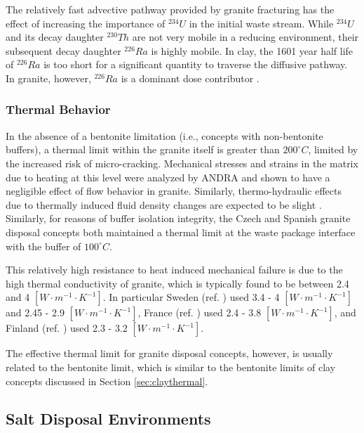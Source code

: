 The relatively fast advective pathway provided by granite fracturing
has the effect of increasing the importance of $^{234}U$ in the initial waste 
stream. While $^{234}U$ and its decay daughter $^{230}Th$ are not very mobile 
in a reducing environment, their subsequent decay daughter $^{226}Ra$ is highly 
mobile. In clay, the 1601 year half life of $^{226}Ra$ is too short for a 
significant quantity to traverse the diffusive pathway. In granite, however,  
$^{226}Ra$ is a dominant dose contributor \cite{swift_applying_2010}. 

\subsubsection{Thermal Behavior}
\label{subsec:granitethermal}
In the absence of a bentonite limitation (i.e., concepts with non-bentonite 
buffers), a thermal limit within the granite itself is greater than 
$200^{\circ}C$, limited by the increased risk of micro-cracking.
Mechanical stresses and strains in the matrix due to heating at this 
level were analyzed by \gls{ANDRA} and shown to have a negligible effect of 
flow behavior in granite. Similarly, thermo-hydraulic effects due to thermally
induced fluid density changes are expected to be slight 
\cite{andra_granite:_2005}.
Similarly, for reasons of buffer isolation integrity, the Czech and Spanish
granite disposal concepts both maintained a thermal limit at the waste package
interface with the buffer of $100^{\circ}C$.  \cite{von_lensa_red-impact_2008}

This relatively high resistance to heat  induced mechanical failure is due to the 
high thermal conductivity of granite, which is typically found to be between 
2.4 and 4 $[W\cdot m^{-1}\cdot K^{-1}]$.  In particular Sweden (ref. 
\cite{ab_long-term_2006}) used 3.4 - 4 $[W\cdot m^{-1}\cdot K^{-1}]$  and 2.45 
- 2.9 $[W\cdot m^{-1}\cdot K^{-1}]$,  France (ref.  \cite{andra_argile:_2005}) 
used 2.4 - 3.8 $[W\cdot m^{-1}\cdot K^{-1}]$, and  Finland (ref. 
\cite{posiva_interim_2010}) used 2.3 - 3.2 $[W\cdot m^{-1}\cdot K^{-1}]$.

The effective thermal limit for granite disposal concepts, however, is usually 
related to the bentonite limit, which is similar to the bentonite limits of clay 
concepts discussed in Section \ref{sec:claythermal}.

\subsection{Salt Disposal Environments}

